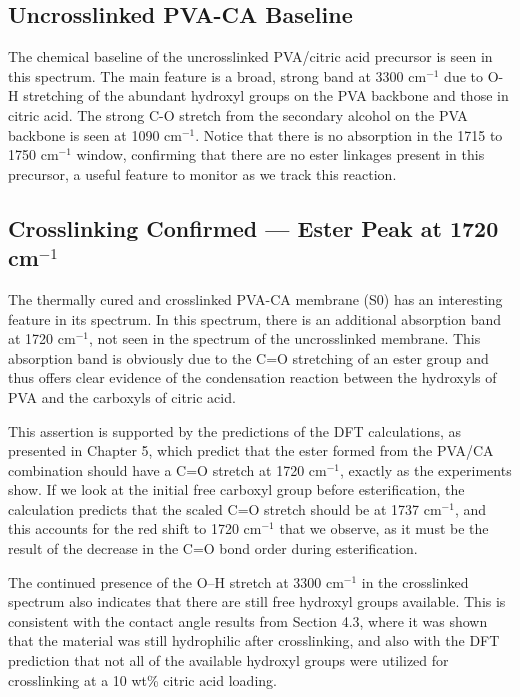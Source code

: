 \documentclass[12pt,a4paper]{report}
\begin{document}
\subsection{Uncrosslinked PVA-CA Baseline}
The chemical baseline of the uncrosslinked PVA/citric acid precursor is seen in this spectrum. The main feature is a broad, strong band at 3300 cm\(^{-1}\) due to O-H stretching of the abundant hydroxyl groups on the PVA backbone and those in citric acid. The strong C-O stretch from the secondary alcohol on the PVA backbone is seen at 1090 cm\(^{-1}\). Notice that there is no absorption in the 1715 to 1750 cm\(^{-1}\) window, confirming that there are no ester linkages present in this precursor, a useful feature to monitor as we track this reaction.\cite{36, 69}

\subsection{Crosslinking Confirmed — Ester Peak at 1720 cm\(^{-1}\)}
The thermally cured and crosslinked PVA-CA membrane (S0) has an interesting feature in its spectrum. In this spectrum, there is an additional absorption band at 1720 cm\(^{-1}\), not seen in the spectrum of the uncrosslinked membrane. This absorption band is obviously due to the C=O stretching of an ester group and thus offers clear evidence of the condensation reaction between the hydroxyls of PVA and the carboxyls of citric acid.\cite{36,51,96}

This assertion is supported by the predictions of the DFT calculations, as presented in Chapter 5, which predict that the ester formed from the PVA/CA combination should have a C=O stretch at 1720 cm\(^{-1}\), exactly as the experiments show. If we look at the initial free carboxyl group before esterification, the calculation predicts that the scaled C=O stretch should be at 1737 cm\(^{-1}\), and this accounts for the red shift to 1720 cm\(^{-1}\) that we observe, as it must be the result of the decrease in the C=O bond order during esterification.\cite{94}

The continued presence of the O–H stretch at 3300 cm\(^{-1}\) in the crosslinked spectrum also indicates that there are still free hydroxyl groups available. This is consistent with the contact angle results from Section 4.3, where it was shown that the material was still hydrophilic after crosslinking, and also with the DFT prediction that not all of the available hydroxyl groups were utilized for crosslinking at a 10 wt\% citric acid loading.
\end{document}

